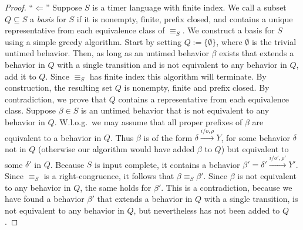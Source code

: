 \begin{proof}
``$\Leftarrow$'' 
Suppose $S$ is a timer language with finite index.
We call a subset $Q \subseteq S$ a \emph{basis} for $S$ if it is nonempty, finite, prefix closed, and contains a unique representative from
each equivalence class of $\equiv_S$.
We construct a basis for $S$ using a simple greedy algorithm. Start by setting $Q := \{ \emptyset \}$, where $\emptyset$ is the trivial untimed behavior. Then, as long as an untimed behavior $\beta$ exists that extends a behavior in $Q$ with a single transition and
is not equivalent to any behavior in $Q$, add it to $Q$.  Since $\equiv_S$ has finite index this algorithm will terminate.
By construction, the resulting set $Q$ is nonempty, finite and prefix closed.
By contradiction, we prove that $Q$ contains a representative from each equivalence class.
Suppose $\beta \in S$ is an untimed behavior that is not equivalent to any behavior in $Q$.
W.l.o.g.\ we may assume that all proper prefixes of $\beta$ are equivalent to a behavior in $Q$.
Thus $\beta$ is of the form $\delta \xrightarrow{i/o, \rho} Y$, for some behavior $\delta$ not in $Q$ (otherwise our algorithm would
have added $\beta$ to $Q$) but equivalent to some $\delta'$ in $Q$.
Because $S$ is input complete, it contains a behavior $\beta' = \delta' \xrightarrow{i/o', \rho'} Y'$.
Since $\equiv_S$ is a right-congruence, it follows that $\beta \equiv_S \beta'$.
Since $\beta$ is not equivalent to any behavior in $Q$, the same holds for $\beta'$.
This is a contradiction, because we have found a behavior $\beta'$ that extends a behavior in $Q$ with a single transition,
is not equivalent to any behavior in $Q$, but nevertheless has not been added to $Q$.


\end{proof}
